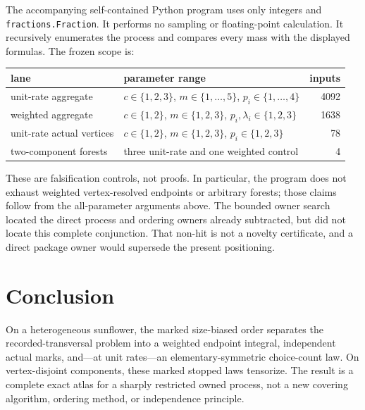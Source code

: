 \documentclass[10pt,a4paper]{amsart}
\begin{document}
The accompanying self-contained Python program uses only integers and
\texttt{fractions.Fraction}.  It performs no sampling or floating-point
calculation.  It recursively enumerates the process and compares every mass
with the displayed formulas.  The frozen scope is:
\begin{center}
\begin{tabular}{@{}p{}p{}r@{}}
\toprule
lane & parameter range & inputs\\
\midrule
unit-rate aggregate & $c\in\{1,2,3\}$, $m\in\{1,\ldots,5\}$,
  $p_i\in\{1,\ldots,4\}$ & 4092\\
weighted aggregate & $c\in\{1,2\}$, $m\in\{1,2,3\}$,
  $p_i,\lambda_i\in\{1,2,3\}$ & 1638\\
unit-rate actual vertices & $c\in\{1,2\}$, $m\in\{1,2,3\}$,
  $p_i\in\{1,2,3\}$ & 78\\
two-component forests & three unit-rate and one weighted control & 4\\
\bottomrule
\end{tabular}
\end{center}
These are falsification controls, not proofs.  In particular, the program does
not exhaust weighted vertex-resolved endpoints or arbitrary forests; those
claims follow from the all-parameter arguments above.  The bounded owner
search located the direct process and ordering owners already subtracted, but
did not locate this complete conjunction.  That non-hit is not a novelty
certificate, and a direct package owner would supersede the present
positioning.

\section{Conclusion}

On a heterogeneous sunflower, the marked size-biased order separates the
recorded-transversal problem into a weighted endpoint integral, independent
actual marks, and---at unit rates---an elementary-symmetric choice-count law.  On
vertex-disjoint components, these marked stopped laws tensorize.  The result
is a complete exact atlas for a sharply restricted owned process, not a new
covering algorithm, ordering method, or independence principle.



\end{document}

